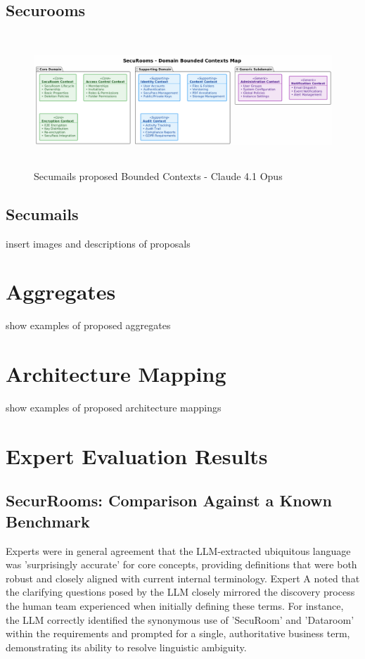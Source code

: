 \subsection{Securooms}
\begin{figure}[htbp]
  \centering
  \includegraphics[height=5cm]{figures/bounded-context-securoom-claude.png} 
  \caption{Secumails proposed Bounded Contexts - Claude 4.1 Opus}
  \label{fig:diagram-bounded-contexts-secumail-claude} 
\end{figure}

\subsection{Secumails}
insert images and descriptions of proposals

\section{Aggregates}

show examples of proposed aggregates

\section{Architecture Mapping}

show examples of proposed architecture mappings

\section{Expert Evaluation Results}

\subsection{SecurRooms: Comparison Against a Known Benchmark}

Experts were in general agreement that the LLM-extracted ubiquitous language was 'surprisingly accurate' for core concepts, providing definitions that were both robust and closely aligned with current internal terminology. Expert A noted that the clarifying questions posed by the LLM closely mirrored the discovery process the human team experienced when initially defining these terms. For instance, the LLM correctly identified the synonymous use of 'SecuRoom' and 'Dataroom' within the requirements and prompted for a single, authoritative business term, demonstrating its ability to resolve linguistic ambiguity.


